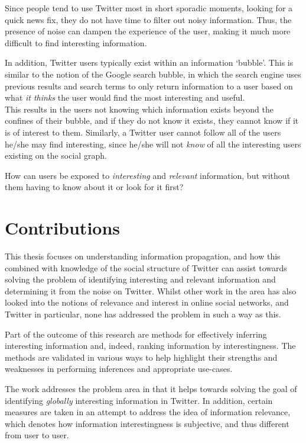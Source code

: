 Since people tend to use Twitter most in short sporadic moments, looking for a quick news fix, they do not have time to filter out noisy information. Thus, the presence of noise can dampen the experience of the user, making it much more difficult to find interesting information.

In addition, Twitter users typically exist within an information `bubble'. This is similar to the notion of the Google search bubble, in which the search engine uses previous results and search terms to only return information to a user based on what \textit{it thinks} the user would find the most interesting and useful.\\
This results in the users not knowing which information exists beyond the confines of their bubble, and if they do not know it exists, they cannot know if it is of interest to them. Similarly, a Twitter user cannot follow all of the users he/she may find interesting, since he/she will not \textit{know} of all the interesting users existing on the social graph.

How can users be exposed to \textit{interesting} and \textit{relevant} information, but without them having to know about it or look for it first?


\section{Contributions}
This thesis focuses on understanding information propagation, and how this combined with knowledge of the social structure of Twitter can assist towards solving the problem of identifying interesting and relevant information and determining it from the noise on Twitter. 
Whilst other work in the area has also looked into the notions of relevance and interest in online social networks, and Twitter in particular, none has addressed the problem in such a way as this.

Part of the outcome of this research are methods for effectively inferring interesting information and, indeed, ranking information by interestingness. The methods are validated in various ways to help highlight their strengths and weaknesses in performing inferences and appropriate use-cases.

The work addresses the problem area in that it helps towards solving the goal of identifying \textit{globally} interesting information in Twitter. In addition, certain measures are taken in an attempt to address the idea of information relevance, which denotes how information interestingness is subjective, and thus different from user to user.


